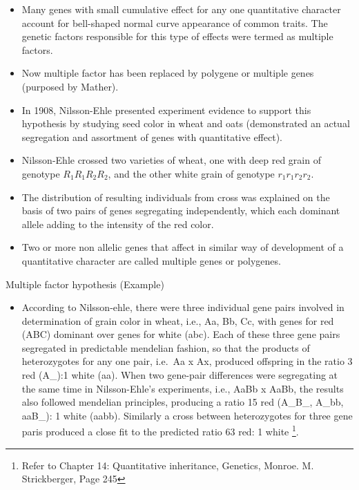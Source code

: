 \documentclass[11pt,ignorenonframetext,aspectratio=169]{beamer}
\providecommand{\tightlist}{%
  \setlength{\itemsep}{0pt}\setlength{\parskip}{0pt}}
\begin{document}
\begin{frame}{}
\protect\hypertarget{section-3}{}
\begin{itemize}
\tightlist
\item
  Many genes with small cumulative effect for any one quantitative
  character account for bell-shaped normal curve appearance of common
  traits. The genetic factors responsible for this type of effects were
  termed as multiple factors.
\item
  Now multiple factor has been replaced by polygene or multiple genes
  (purposed by Mather).
\item
  In 1908, Nilsson-Ehle presented experiment evidence to support this
  hypothesis by studying seed color in wheat and oats (demonstrated an
  actual segregation and assortment of genes with quantitative effect).
\item
  Nilsson-Ehle crossed two varieties of wheat, one with deep red grain
  of genotype \(R_1R_1R_2R_2\), and the other white grain of genotype
  \(r_1r_1r_2r_2\).
\item
  The distribution of resulting individuals from cross was explained on
  the basis of two pairs of genes segregating independently, which each
  dominant allele adding to the intensity of the red color.
\item
  Two or more non allelic genes that affect in similar way of
  development of a quantitative character are called multiple genes or
  polygenes.
\end{itemize}
\end{frame}

\begin{frame}{Multiple factor hypothesis (Example)}
\protect\hypertarget{multiple-factor-hypothesis-example}{}
\begin{itemize}
\tightlist
\item
  According to Nilsson-ehle, there were three individual gene pairs
  involved in determination of grain color in wheat, i.e., Aa, Bb, Cc,
  with genes for red (ABC) dominant over genes for white (abc). Each of
  these three gene pairs segregated in predictable mendelian fashion, so
  that the products of heterozygotes for any one pair, i.e.~Aa x Ax,
  produced offspring in the ratio 3 red (A\_):1 white (aa). When two
  gene-pair differences were segregating at the same time in
  Nilsson-Ehle's experiments, i.e., AaBb x AaBb, the results also
  followed mendelian principles, producing a ratio 15 red (A\_B\_,
  A\_bb, aaB\_): 1 white (aabb). Similarly a cross between heterozygotes
  for three gene paris produced a close fit to the predicted ratio 63
  red: 1 white
  \footnote[frame]{Refer to Chapter 14: Quantitative inheritance, Genetics, Monroe. M. Strickberger, Page 245}.
\end{itemize}
\end{frame}
\end{document}
